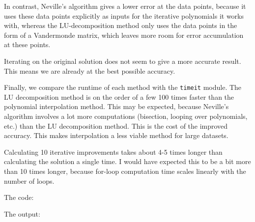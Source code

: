 In contrast, Neville's algorithm gives a lower error at the data points, because it uses these data points explicitly as inputs for the iterative polynomials
it works with, whereas the LU-decomposition method only uses the data points in the form of a Vandermonde matrix, which leaves more room for error accumulation
at these points.

Iterating on the original solution does not seem to give a more accurate result. This means we are already at the best possible accuracy.

Finally, we compare the runtime of each method with the \texttt{timeit} module. The LU decomposition method
is on the order of a few 100 times faster than the polynomial interpolation method. This may be expected,
because Neville's algorithm involves a lot more computations (bisection, looping over polynomials, etc.) 
than the LU decomposition method. This is the cost of the improved accuracy. This makes interpolation
a less viable method for large datasets.

Calculating 10 iterative improvements takes about 4-5 times longer than calculating the solution a single time.
I would have expected this to be a bit more than 10 times longer, because for-loop computation time scales 
linearly with the number of loops.

\noindent The code:



\noindent The output:


